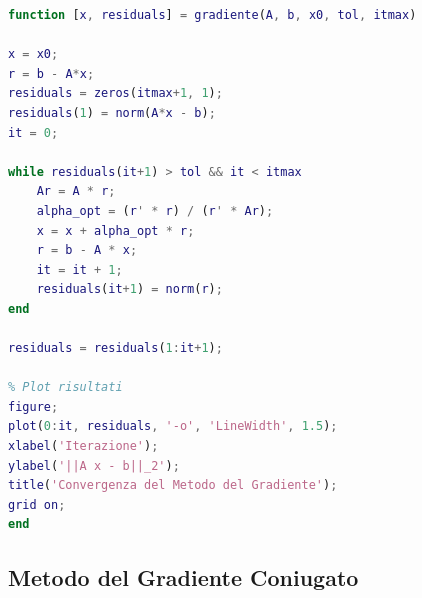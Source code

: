 \documentclass[12pt,a4paper]{article}
\begin{document}
\begin{flushleft}
\end{flushleft}

\vspace{1em}
\begin{lstlisting}[language=Matlab]
function [x, residuals] = gradiente(A, b, x0, tol, itmax)

x = x0;
r = b - A*x;
residuals = zeros(itmax+1, 1);
residuals(1) = norm(A*x - b);
it = 0;

while residuals(it+1) > tol && it < itmax
    Ar = A * r;
    alpha_opt = (r' * r) / (r' * Ar);
    x = x + alpha_opt * r;
    r = b - A * x;
    it = it + 1;
    residuals(it+1) = norm(r);
end

residuals = residuals(1:it+1);

% Plot risultati
figure;
plot(0:it, residuals, '-o', 'LineWidth', 1.5);
xlabel('Iterazione');
ylabel('||A x - b||_2');
title('Convergenza del Metodo del Gradiente');
grid on;
end

\end{lstlisting}

\newpage
\subsection*{Metodo del Gradiente Coniugato}
\end{document}
